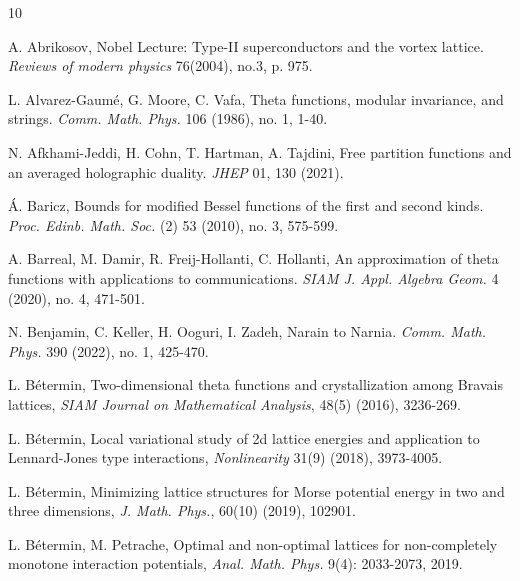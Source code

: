 \documentclass[reqno,english]{amsart}
\newtheorem{open problem}{Open Problem}[section]
\newtheorem{open question}{Open Question}[section]
\newtheorem{open questions on hexagonal lattice}{Open Questions on hexagonal lattice}[section]
\begin{document}
\begin{thebibliography}{10}

 A. Abrikosov, Nobel Lecture: Type-II superconductors and the vortex lattice. {\em Reviews of modern physics} 76(2004), no.3, p. 975.

L. Alvarez-Gaum\'e, G. Moore, C. Vafa, Theta functions, modular invariance, and strings. {\em Comm. Math. Phys.} 106 (1986), no. 1, 1-40.

N. Afkhami-Jeddi, H. Cohn, T. Hartman, A. Tajdini, Free partition functions and an averaged holographic
duality. {\it JHEP} 01, 130 (2021).

\'A. Baricz, Bounds for modified Bessel functions of the first and second kinds.
{\em Proc. Edinb. Math. Soc.} (2) 53 (2010), no. 3, 575-599.

A. Barreal, M. Damir, R. Freij-Hollanti, C. Hollanti,
An approximation of theta functions with applications to communications.
{\em SIAM J. Appl. Algebra Geom.} 4 (2020), no. 4, 471-501.


N. Benjamin, C. Keller, H. Ooguri, I. Zadeh, Narain to Narnia. {\em Comm. Math. Phys.} 390 (2022), no. 1, 425-470.


  L. B\'etermin,
Two-dimensional theta functions and crystallization among Bravais lattices, {\em SIAM Journal on Mathematical Analysis},
 48(5) (2016), 3236-269.


  L. B\'etermin,
Local variational study of 2d lattice energies and application to Lennard-Jones type interactions, {\em Nonlinearity}
31(9) (2018), 3973-4005.



  L. B\'etermin,
Minimizing lattice structures for Morse potential energy in two and three dimensions, {\em  J. Math. Phys.},
60(10) (2019), 102901.

 L. B\'etermin, M. Petrache,
Optimal and non-optimal lattices for non-completely monotone interaction potentials, {\em Anal. Math. Phys.} 9(4): 2033-2073, 2019.



\end{thebibliography}
\end{document}
